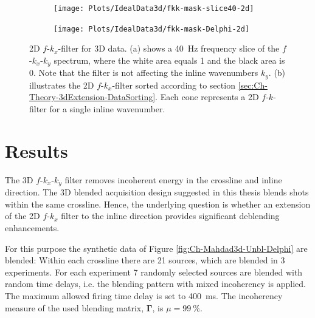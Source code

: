\begin{figure}

	\centering 
	\begin{subfigure}[t]{0.45\textwidth}
		\centering
		\texttt{[image: Plots/IdealData3d/fkk-mask-slice40-2d]}
		\caption{}
		\label{fig:Ch-Mahdad3d-2dfk-slice}
	\end{subfigure}
	
	\par\bigskip
	
	\centering
	\begin{subfigure}[t]{\textwidth}
		\centering
		\texttt{[image: Plots/IdealData3d/fkk-mask-Delphi-2d]}
		\caption{}
		\label{fig:Ch-Mahdad3d-2dfk-Delphi}
	\end{subfigure}
	
	\caption{2D $f$-$k_x$-filter for 3D data. (a) shows a \SI{40}{\hertz} frequency slice of the $f$-$k_x$-$k_y$ spectrum, where the white area equals 1 and the black area is 0. Note that the filter is not affecting the inline wavenumbers $k_y$. (b) illustrates the 2D $f$-$k_x$-filter sorted according to section \ref{sec:Ch-Theory-3dExtension-DataSorting}. Each cone represents a 2D $f$-$k$-filter for a single inline wavenumber.}
	\label{fig:Ch-Mahdad3d-2dfk}
\end{figure}

\section{Results}

The 3D $f$-$k_x$-$k_y$ filter removes incoherent energy in the crossline and inline direction. The 3D blended acquisition design suggested in this thesis blends shots within the same crossline. Hence, the underlying question is whether an extension of the 2D $f$-$k_x$ filter to the inline direction provides significant deblending enhancements.

For this purpose the synthetic data of Figure \ref{fig:Ch-Mahdad3d-Unbl-Delphi} are blended: Within each crossline there are 21 sources, which are blended in 3 experiments. For each experiment 7 randomly selected sources are blended with random time delays, i.e. the blending pattern with mixed incoherency is applied. The maximum allowed firing time delay is set to \SI{400}{\milli\second}. The incoherency measure of the used blending matrix, $\mathbf{\Gamma}$, is $\mu = \SI{99}{\percent}$. 

